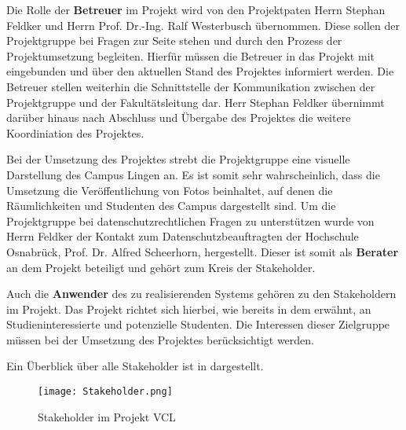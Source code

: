 Die Rolle der \textbf{Betreuer} im Projekt wird von den Projektpaten Herrn Stephan
Feldker und Herrn Prof. Dr.-Ing. Ralf Westerbusch übernommen. Diese sollen der
Projektgruppe bei Fragen zur Seite stehen und durch den Prozess der
Projektumsetzung begleiten. Hierfür müssen die Betreuer in das Projekt mit
eingebunden und über den aktuellen Stand des Projektes informiert werden. Die
Betreuer stellen weiterhin die Schnittstelle der Kommunikation zwischen der
Projektgruppe und der Fakultätsleitung dar. Herr Stephan Feldker übernimmt
darüber hinaus nach Abschluss und Übergabe des Projektes die weitere Koordiniation des Projektes.

Bei der Umsetzung des Projektes strebt die Projektgruppe eine visuelle
Darstellung des Campus Lingen an. Es ist somit sehr wahrscheinlich, dass die
Umsetzung die Veröffentlichung von Fotos beinhaltet, auf denen die
Räumlichkeiten und Studenten des Campus dargestellt sind. Um die Projektgruppe
bei datenschutzrechtlichen Fragen zu unterstützen wurde von Herrn Feldker der
Kontakt zum Datenschutzbeauftragten der Hochschule Osnabrück, Prof. Dr. Alfred
Scheerhorn, hergestellt. Dieser ist somit als \textbf{Berater} an dem Projekt beteiligt
und gehört zum Kreis der Stakeholder.

Auch die \textbf{Anwender} des zu realisierenden Systems gehören zu den Stakeholdern im
Projekt. Das Projekt richtet sich hierbei, wie bereits in dem
 erwähnt, an Studieninteressierte und potenzielle
Studenten. Die Interessen dieser Zielgruppe müssen bei der Umsetzung des
Projektes berücksichtigt werden.

Ein Überblick über alle Stakeholder ist in  dargestellt.

\clearpage
\begin{figure}[htb] 
\centering
\texttt{[image: Stakeholder.png]}
\caption[Stakeholder im Projekt \acs{VCL}]{Stakeholder im Projekt \acs{VCL}\protect\footnotemark}
\label{fig:Stakeholder}
\end{figure}
